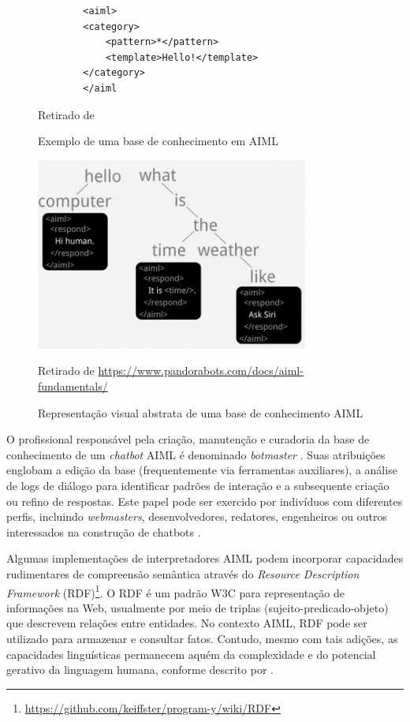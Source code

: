 \documentclass[14pt,a4paper,oneside]{book}
\begin{document}
\begin{figure}
	\centering
	\caption{Exemplo de uma base de conhecimento em AIML}
	\begin{verbatim}
		<aiml>
		<category>
			<pattern>*</pattern>
			<template>Hello!</template>
		</category>
		</aiml
	\end{verbatim}	
	\label{fig:exemplodeumabase}
	\vspace{0.2cm} %
    {\footnotesize 
	
	Retirado de \cite{Wallace2000}}
\end{figure}

\begin{figure}
    \centering
    \caption{Representação visual abstrata de uma base de conhecimento AIML}
    \includegraphics[width=0.8\textwidth]{./fig/image12.png} %
    \label{fig:representacaovisualabstrata}
    \vspace{0.2cm} %
    {\footnotesize 
	
	Retirado de \url{https://www.pandorabots.com/docs/aiml-fundamentals/}}
\end{figure}

O profissional responsável pela criação, manutenção e curadoria da base de conhecimento de um \emph{chatbot} AIML é denominado \emph{botmaster} \cite{Wallace2000}. Suas atribuições englobam a edição da base (frequentemente via ferramentas auxiliares), a análise de logs de diálogo para identificar padrões de interação e a subsequente criação ou refino de respostas. Este papel pode ser exercido por indivíduos com diferentes perfis, incluindo \emph{webmasters}, desenvolvedores, redatores, engenheiros ou outros interessados na construção de chatbots \cite{Wallace2000}.

Algumas implementações de interpretadores AIML podem incorporar capacidades rudimentares de compreensão semântica através do \emph{Resource Description Framework} (RDF)\footnote{\url{https://github.com/keiffster/program-y/wiki/RDF}}. O RDF é um padrão W3C para representação de informações na Web, usualmente por meio de triplas (sujeito-predicado-objeto) que descrevem relações entre entidades. No contexto AIML, RDF pode ser utilizado para armazenar e consultar fatos. Contudo, mesmo com tais adições, as capacidades linguísticas permanecem aquém da complexidade e do potencial gerativo da linguagem humana, conforme descrito por \cite{chomsky2002syntactic}.
\end{document}
